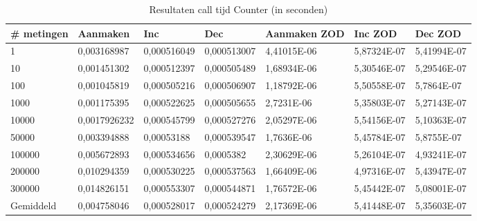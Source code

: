 \begin{sidewaystable}
\centering
\begin{tabular}{|l|l|l|l|l|l|l|}
\hline
\# metingen   & Aanmaken     & Inc         & Dec         & Aanmaken ZOD & Inc ZOD     & Dec ZOD     \\ \hline
1         & 0,003168987  & 0,000516049 & 0,000513007 & 4,41015E-06  & 5,87324E-07 & 5,41994E-07 \\ \hline
10        & 0,001451302  & 0,000512397 & 0,000505489 & 1,68934E-06  & 5,30546E-07 & 5,29546E-07 \\ \hline
100       & 0,001045819  & 0,000505216 & 0,000506907 & 1,18792E-06  & 5,50558E-07 & 5,7864E-07  \\ \hline
1000      & 0,001175395  & 0,000522625 & 0,000505655 & 2,7231E-06   & 5,35803E-07 & 5,27143E-07 \\ \hline
10000     & 0,0017926232 & 0,000545799 & 0,000527276 & 2,05297E-06  & 5,54156E-07 & 5,10363E-07 \\ \hline
50000     & 0,003394888  & 0,00053188  & 0,000539547 & 1,7636E-06   & 5,45784E-07 & 5,8755E-07  \\ \hline
100000    & 0,005672893  & 0,000534656 & 0,0005382   & 2,30629E-06  & 5,26104E-07 & 4,93241E-07 \\ \hline
200000    & 0,010294359  & 0,000530225 & 0,000537563 & 1,66409E-06  & 4,97316E-07 & 5,43947E-07 \\ \hline
300000    & 0,014826151  & 0,000553307 & 0,000544871 & 1,76572E-06  & 5,45442E-07 & 5,08001E-07 \\ \hline
Gemiddeld & 0,004758046  & 0,000528017 & 0,000524279 & 2,17369E-06  & 5,41448E-07 & 5,35603E-07 \\ \hline
\end{tabular}
\caption{Resultaten call tijd Counter (in seconden)}
\label{Table:Counter}
\end{sidewaystable}

